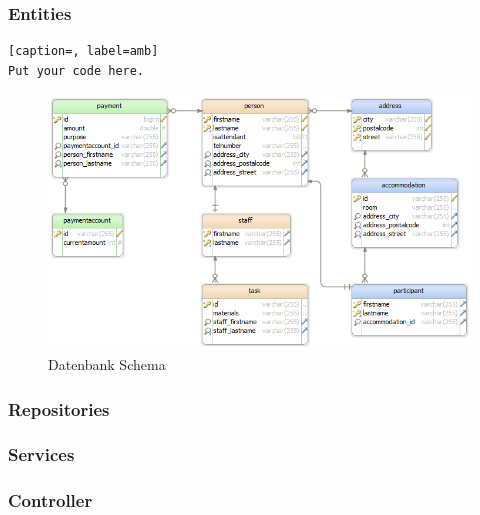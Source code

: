 \FloatBarrier
\subsubsection{Entities}

\begin{lstlisting}[caption=, label=amb]
Put your code here.
\end{lstlisting}

\begin{figure}[h]
\centering
\includegraphics[width=\linewidth]{3_backend/pics/db_scheme}
\caption{Datenbank Schema}
\label{fig:db_scheme}
\end{figure}


\subsubsection{Repositories}

\subsubsection{Services}

\subsubsection{Controller}
